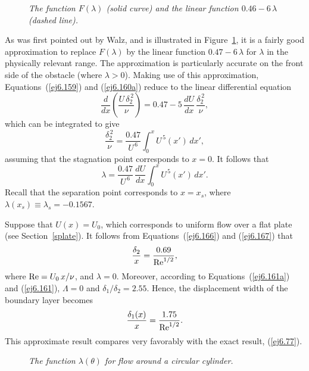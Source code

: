 \begin{figure}
\epsfysize=3.5in
\centerline{}
\caption{\em The function $F(\lambda)$ (solid curve)  and the linear function $0.46-6\,\lambda$ (dashed line).}\label{fwalz}
\end{figure}

As was first pointed out by Walz, and is illustrated in Figure~\ref{fwalz}, it is a fairly good approximation to
replace $F(\lambda)$ by the linear function
$0.47-6\,\lambda$
for $\lambda$ in the physically relevant range.  The approximation is
particularly accurate on the front side of the obstacle (where $\lambda>0$). Making use of this
approximation, Equations~(\ref{ej6.159}) and (\ref{ej6.160a}) reduce to 
the linear differential equation 
\begin{equation}
\frac{d}{dx}\!\left(\frac{U\,\delta_2^{\,2}}{\nu}\right) = 0.47 - 5\,\frac{dU}{dx}\,\frac{\delta_2^{\,2}}{\nu},
\end{equation}
which can be integrated to give
\begin{equation}\label{ej6.166}
\frac{\delta_2^{\,2}}{\nu} = \frac{0.47}{U^{\,6}}\int_0^x U^{\,5}(x')\,dx',
\end{equation}
assuming that the stagnation point corresponds to $x=0$. It follows that
\begin{equation}\label{ej6.167}
\lambda= \frac{0.47}{U^{\,6}}\,\frac{dU}{dx}\int_0^x U^{\,5}(x')\,dx'.
\end{equation}
Recall that the separation point corresponds to $x=x_s$, where $\lambda(x_s)\equiv\lambda_s= -0.1567$. 

Suppose that $U(x)=U_0$, which corresponds to uniform flow over a flat plate (see Section~\ref{splate}). 
It follows from Equations~(\ref{ej6.166}) and (\ref{ej6.167}) that 
\begin{equation}
\frac{\delta_2}{x} = \frac{0.69}{{\rm Re}^{1/2}},
\end{equation}
where ${\rm Re}=U_0\,x/\nu$, and $\lambda=0$. Moreover, according to Equations~(\ref{ej6.161a}) and (\ref{ej6.161}),
$\Lambda=0$ and $\delta_1/\delta_2=2.55$. Hence, the displacement width of the boundary layer becomes
\begin{equation}
\frac{\delta_1(x)}{x} = \frac{1.75}{{\rm Re}^{1/2}}.
\end{equation}
This approximate result compares very favorably with the exact result, (\ref{ej6.77}).

\begin{figure}
\epsfysize=3.5in
\centerline{}
\caption{\em The function $\lambda(\theta)$ for flow around a circular cylinder.}\label{fccyl}
\end{figure}

